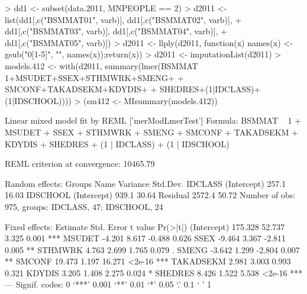 \documentclass[a4paper]{article}
\begin{document}
\begin{Schunk}
\begin{Sinput}
> dd1 <- subset(data.2011, MNPEOPLE == 2)
> d2011 <- list(dd1[,c("BSMMAT01", varb)], dd1[,c("BSMMAT02", varb)], 
+               dd1[,c("BSMMAT03", varb)], dd1[,c("BSMMAT04", varb)],
+               dd1[,c("BSMMAT05", varb)])
> d2011 <- llply(d2011, function(x) {names(x) <- gsub("0[1-5]", "", names(x));return(x)})
> d2011 <- imputationList(d2011)
> models.412 <- with(d2011, summary(lmer(BSMMAT ~ 1+MSUDET+SSEX+STHMWRK+SMENG+
+                                          SMCONF+TAKADSEKM+KDYDIS+
+                                          SHEDRES+(1|IDCLASS)+(1|IDSCHOOL))))
> (sm412 <- MIsummary(models.412))
\end{Sinput}
\begin{Soutput}
Linear mixed model fit by REML ['merModLmerTest']
Formula: BSMMAT ~ 1 + MSUDET + SSEX + STHMWRK + SMENG + SMCONF + TAKADSEKM +      KDYDIS + SHEDRES + (1 | IDCLASS) + (1 | IDSCHOOL) 

REML criterion at convergence: 10465.79 

Random effects:
 Groups   Name        Variance Std.Dev.
 IDCLASS  (Intercept)  257.1   16.03   
 IDSCHOOL (Intercept)  939.1   30.64   
 Residual             2572.4   50.72   
Number of obs: 975, groups: IDCLASS, 47; IDSCHOOL, 24

Fixed effects:
            Estimate Std. Error t value Pr(>|t|)    
(Intercept)  175.328     52.737   3.325    0.001 ***
MSUDET        -4.201      8.617  -0.488    0.626    
SSEX          -9.464      3.367  -2.811    0.005 ** 
STHMWRK        4.763      2.699   1.765    0.079 .  
SMENG         -3.642      1.299  -2.804    0.007 ** 
SMCONF        19.473      1.197  16.271   <2e-16 ***
TAKADSEKM      2.981      3.003   0.993    0.321    
KDYDIS         3.205      1.408   2.275    0.024 *  
SHEDRES        8.426      1.522   5.538   <2e-16 ***
---
Signif. codes:  0 ‘***’ 0.001 ‘**’ 0.01 ‘*’ 0.05 ‘.’ 0.1 ‘ ’ 1


\end{Soutput}
\end{Schunk}
\end{document}
